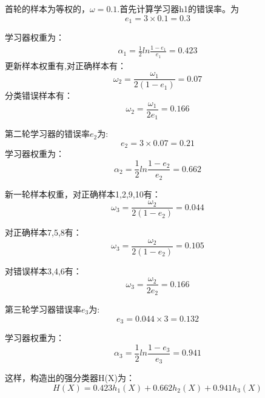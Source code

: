 \documentclass{ctexart}
\begin{document}
首轮的样本为等权的，$\omega=0.1$.首先计算学习器h1的错误率。为
\begin{equation*}
e_1=3\times0.1=0.3
\end{equation*}

学习器权重为：
\begin{align*}
\alpha_1=\frac{1}{2}ln\frac{1-e_1}{e_1}=0.423
\end{align*}
更新样本权重有,对正确样本有：
\begin{equation*}
\omega_2=\frac{\omega_1}{2(1-e_1)}=0.07
\end{equation*}
分类错误样本有：
\begin{equation*}
\omega_2=\frac{\omega_1}{2e_1}=0.166
\end{equation*}

第二轮学习器的错误率$e_2$为:
\begin{equation*}
e_2=3\times0.07=0.21
\end{equation*}
学习器权重为：
\begin{equation*}
\alpha_2=\frac{1}{2}ln\frac{1-e_2}{e_2}=0.662
\end{equation*}

新一轮样本权重，对正确样本1,2,9,10有：
\begin{equation*}
\omega_3=\frac{\omega_2}{2(1-e_2)}= 0.044
\end{equation*}

对正确样本7,5,8有：
\begin{equation*}
\omega_3=\frac{\omega_2}{2(1-e_2)}= 0.105
\end{equation*}

对错误样本3,4,6有：
\begin{equation*}
\omega_3=\frac{\omega_2}{2e_2}= 0.166
\end{equation*}

第三轮学习器错误率$e_3$为:
\begin{equation*}
e_3=0.044\times3=0.132
\end{equation*}

学习器权重为：
\begin{equation*}
\alpha_3=\frac{1}{2}ln\frac{1-e_3}{e_3}=0.941
\end{equation*}

这样，构造出的强分类器H(X)为：
\begin{equation*}
H(X)=0.423h_1(X)+0.662h_2(X)+0.941h_3(X)
\end{equation*}
\end{document}
